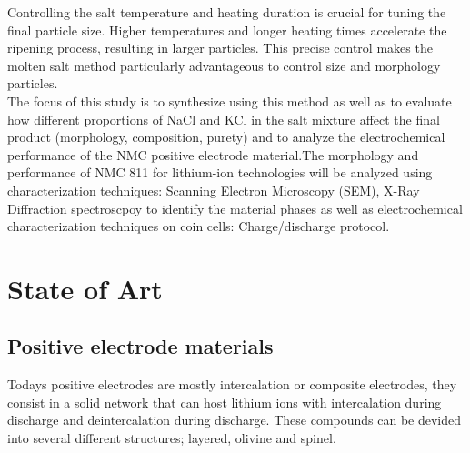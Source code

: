 \documentclass{article}
\begin{document}
Controlling the salt temperature and heating duration is crucial for tuning the final particle size. Higher temperatures and longer heating times accelerate the ripening process, resulting in larger particles. This precise control makes the molten salt method particularly advantageous to control size and morphology particles. \cite{moltensalt1} \\

The focus of this study is to synthesize using this method as well as to evaluate how different proportions of NaCl and KCl in the salt mixture affect the final product (morphology, composition, purety) and to analyze the electrochemical performance of the NMC positive electrode material.\cite{meltingp}The morphology and performance of NMC 811 for lithium-ion technologies will be analyzed using characterization techniques: Scanning Electron Microscopy (SEM), X-Ray Diffraction spectroscpoy to identify the material phases as well as electrochemical characterization techniques on coin cells: Charge/discharge protocol. \\
\section{State of Art}

\subsection{Positive electrode materials}

Todays positive electrodes are mostly intercalation or composite electrodes, they consist in a solid network that can host lithium ions with intercalation during discharge and deintercalation during discharge.
These compounds can be devided into several different structures; layered, olivine and spinel. \cite{topo} \\
\end{document}
